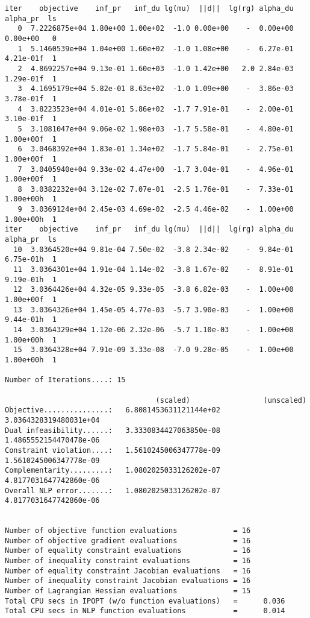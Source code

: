 \begin{lstlisting}
iter    objective    inf_pr   inf_du lg(mu)  ||d||  lg(rg) alpha_du alpha_pr  ls
   0  7.2226875e+04 1.80e+00 1.00e+02  -1.0 0.00e+00    -  0.00e+00 0.00e+00   0
   1  5.1460539e+04 1.04e+00 1.60e+02  -1.0 1.08e+00    -  6.27e-01 4.21e-01f  1
   2  4.8692257e+04 9.13e-01 1.60e+03  -1.0 1.42e+00   2.0 2.84e-03 1.29e-01f  1
   3  4.1695179e+04 5.82e-01 8.63e+02  -1.0 1.09e+00    -  3.86e-03 3.78e-01f  1
   4  3.8223523e+04 4.01e-01 5.86e+02  -1.7 7.91e-01    -  2.00e-01 3.10e-01f  1
   5  3.1081047e+04 9.06e-02 1.98e+03  -1.7 5.58e-01    -  4.80e-01 1.00e+00f  1
   6  3.0468392e+04 1.83e-01 1.34e+02  -1.7 5.84e-01    -  2.75e-01 1.00e+00f  1
   7  3.0405940e+04 9.33e-02 4.47e+00  -1.7 3.04e-01    -  4.96e-01 1.00e+00f  1
   8  3.0382232e+04 3.12e-02 7.07e-01  -2.5 1.76e-01    -  7.33e-01 1.00e+00h  1
   9  3.0369124e+04 2.45e-03 4.69e-02  -2.5 4.46e-02    -  1.00e+00 1.00e+00h  1
iter    objective    inf_pr   inf_du lg(mu)  ||d||  lg(rg) alpha_du alpha_pr  ls
  10  3.0364520e+04 9.81e-04 7.50e-02  -3.8 2.34e-02    -  9.84e-01 6.75e-01h  1
  11  3.0364301e+04 1.91e-04 1.14e-02  -3.8 1.67e-02    -  8.91e-01 9.19e-01h  1
  12  3.0364426e+04 4.32e-05 9.33e-05  -3.8 6.82e-03    -  1.00e+00 1.00e+00f  1
  13  3.0364326e+04 1.45e-05 4.77e-03  -5.7 3.90e-03    -  1.00e+00 9.44e-01h  1
  14  3.0364329e+04 1.12e-06 2.32e-06  -5.7 1.10e-03    -  1.00e+00 1.00e+00h  1
  15  3.0364328e+04 7.91e-09 3.33e-08  -7.0 9.28e-05    -  1.00e+00 1.00e+00h  1

Number of Iterations....: 15

                                   (scaled)                 (unscaled)
Objective...............:   6.8081453631121144e+02    3.0364328319480031e+04
Dual infeasibility......:   3.3330834427063850e-08    1.4865552154470478e-06
Constraint violation....:   1.5610245006347778e-09    1.5610245006347778e-09
Complementarity.........:   1.0802025033126202e-07    4.8177031647742860e-06
Overall NLP error.......:   1.0802025033126202e-07    4.8177031647742860e-06


Number of objective function evaluations             = 16
Number of objective gradient evaluations             = 16
Number of equality constraint evaluations            = 16
Number of inequality constraint evaluations          = 16
Number of equality constraint Jacobian evaluations   = 16
Number of inequality constraint Jacobian evaluations = 16
Number of Lagrangian Hessian evaluations             = 15
Total CPU secs in IPOPT (w/o function evaluations)   =      0.036
Total CPU secs in NLP function evaluations           =      0.014


\end{lstlisting}
